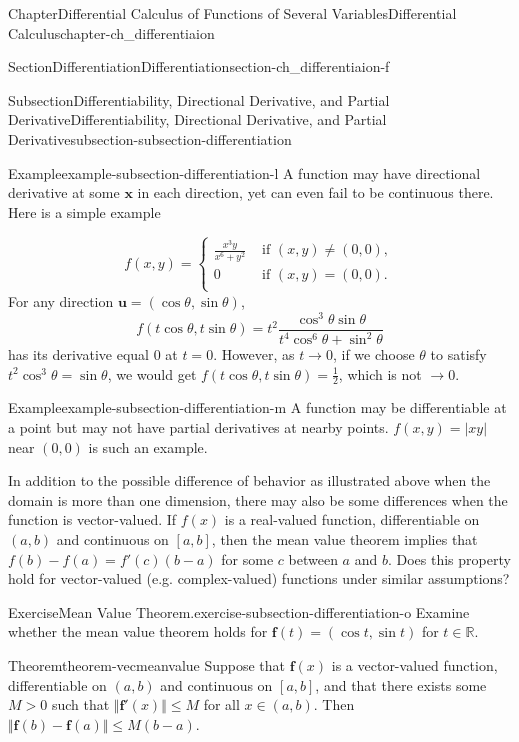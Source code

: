 \documentclass[oneside,10pt,]{book}
\numberwithin{equation}{section}
\newcommand{\bff}{\mathbf{f}}
\newcommand{\bbR}{\mathbb{R}}
\newcommand{\gt}{>}
\newcommand{\amp}{&}
\begin{document}
\begin{chapterptx}{Chapter}{Differential Calculus of Functions of Several Variables}{}{Differential Calculus}{}{}{chapter-ch_differentiaion}
\begin{sectionptx}{Section}{Differentiation}{}{Differentiation}{}{}{section-ch_differentiaion-f}
\begin{subsectionptx}{Subsection}{Differentiability, Directional Derivative, and Partial Derivative}{}{Differentiability, Directional Derivative, and Partial Derivative}{}{}{subsection-subsection-differentiation}
\begin{example}{Example}{}{example-subsection-differentiation-l}
A function may have directional derivative at some \({\mathbf x}\)  in each direction, yet can even fail to be continuous there. Here is a simple example%
\par
%
\begin{equation*}
f(x, y)=\begin{cases} \frac{x^{3}y}{x^{6}+y^{2}} \amp\text{ if } (x, y)\ne (0, 0),\\
0 \amp\text{ if } (x, y)= (0, 0).\\
\end{cases}
\end{equation*}
For any direction \({\mathbf u}=(\cos\theta, \sin\theta)\),%
\begin{equation*}
f(t\cos\theta, t\sin\theta)=t^{2} \frac{\cos^{3}\theta \sin\theta}{t^{4} \cos^{6}\theta+ \sin^{2}\theta}
\end{equation*}
has its derivative equal \(0\) at \(t=0\). However, as \(t\to 0\), if we choose \(\theta\) to satisfy \(t^{2}\cos^{3}\theta =\sin\theta\), we would get \(f(t\cos\theta, t\sin\theta)
=\frac 12\), which is not \(\to 0\).%
\end{example}
\begin{example}{Example}{}{example-subsection-differentiation-m}%
A function may be differentiable at a point but may not have partial derivatives at nearby points. \(f(x, y)=|xy|\) near \((0, 0)\) is such an example.\end{example}
In addition to the possible difference of behavior as illustrated above when the domain is more than one dimension, there may also be some differences when the function is vector-valued. If \(f(x)\) is a real-valued function, differentiable on \((a, b)\) and continuous on \([a, b]\), then the mean value theorem implies that \(f(b)-f(a)=f'(c)(b-a)\) for some \(c\) between \(a\) and \(b\). Does this property hold for vector-valued (e.g. complex-valued) functions under similar assumptions?%
\begin{inlineexercise}{Exercise}{Mean Value Theorem.}{exercise-subsection-differentiation-o}%
Examine whether the mean value theorem holds for \(\bff (t)=(\cos t, \sin t)\) for \(t\in \bbR\).\end{inlineexercise}%
\begin{theorem}{Theorem}{}{}{theorem-vecmeanvalue}%
Suppose that \(\bff(x)\) is a vector-valued function, differentiable on \((a, b)\) and continuous on \([a, b]\), and that there exists some \(M\gt 0\) such that \(\Vert \bff'(x)\Vert \le M\) for all \(x\in (a, b)\). Then \(\Vert \bff(b)-\bff(a)\Vert \le M(b-a)\).%

\end{theorem}
\end{subsectionptx}
\end{sectionptx}
\end{chapterptx}
\end{document}
